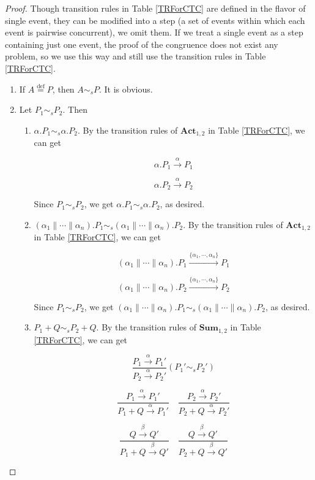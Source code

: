 \begin{proof}
Though transition rules in Table \ref{TRForCTC} are defined in the flavor of single event, they can be modified into a step (a set of events within which each event is pairwise concurrent), we omit them. If we treat a single event as a step containing just one event, the proof of the congruence does not exist any problem, so we use this way and still use the transition rules in Table \ref{TRForCTC}.

\begin{enumerate}
  \item If $A\overset{\text{def}}{=}P$, then $A\sim_s P$. It is obvious.
  \item Let $P_1\sim_s P_2$. Then
        \begin{enumerate}
           \item $\alpha.P_1\sim_s \alpha.P_2$. By the transition rules of $\textbf{Act}_{1,2}$ in Table \ref{TRForCTC}, we can get

           $$\alpha.P_1\xrightarrow{\alpha}P_1$$

           $$\alpha.P_2\xrightarrow{\alpha}P_2$$

           Since $P_1\sim_s P_2$, we get $\alpha.P_1\sim_s \alpha.P_2$, as desired.
           \item $(\alpha_1\parallel\cdots\parallel\alpha_n).P_1\sim_s (\alpha_1\parallel\cdots\parallel\alpha_n).P_2$. By the transition rules of $\textbf{Act}_{1,2}$ in Table \ref{TRForCTC}, we can get

           $$(\alpha_1\parallel\cdots\parallel\alpha_n).P_1\xrightarrow{\{\alpha_1,\cdots,\alpha_n\}}P_1$$

           $$(\alpha_1\parallel\cdots\parallel\alpha_n).P_2\xrightarrow{\{\alpha_1,\cdots,\alpha_n\}}P_2$$

           Since $P_1\sim_s P_2$, we get $(\alpha_1\parallel\cdots\parallel\alpha_n).P_1\sim_s (\alpha_1\parallel\cdots\parallel\alpha_n).P_2$, as desired.
           \item $P_1+Q\sim_s P_2 +Q$. By the transition rules of $\textbf{Sum}_{1,2}$ in Table \ref{TRForCTC}, we can get

           $$\frac{P_1\xrightarrow{\alpha}P_1'}{P_2\xrightarrow{\alpha}P_2'}(P_1'\sim_s P_2')$$

           $$\frac{P_1\xrightarrow{\alpha}P_1'}{P_1+Q\xrightarrow{\alpha}P_1'}
           \quad \frac{P_2\xrightarrow{\alpha}P_2'}{P_2+Q\xrightarrow{\alpha}P_2'}$$

           $$\frac{Q\xrightarrow{\beta}Q'}{P_1+Q\xrightarrow{\beta}Q'}
           \quad \frac{Q\xrightarrow{\beta}Q'}{P_2+Q\xrightarrow{\beta}Q'}$$


\end{enumerate}
\end{enumerate}
\end{proof}
